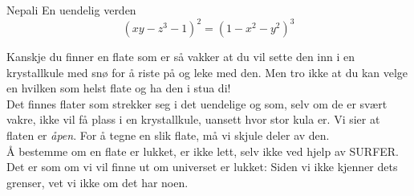 \begin{surferPage}{Nepali}
En uendelig verden \\

\smallskip
\[(x y - z^3 -1)^2= (1 - x^2	- y^2)^3\]

\singlespacing
Kanskje du finner en flate som er så vakker at du vil sette den inn i en krystallkule med snø for å riste på og leke med den. Men tro ikke at du kan velge en hvilken som helst flate og ha den i stua di!
\\
\singlespacing
Det finnes flater som strekker seg i det uendelige og som, selv om de er svært vakre, ikke vil få plass i en krystallkule, uansett hvor stor kula er. Vi sier at flaten er \textit{åpen}. For å tegne en slik flate, må vi skjule deler av den.
\\
\singlespacing
Å bestemme om en flate er lukket, er ikke lett, selv ikke ved hjelp av SURFER. Det er som om vi vil finne ut om universet er lukket: Siden vi ikke kjenner dets grenser, vet vi ikke om det har noen.
\end{surferPage}
